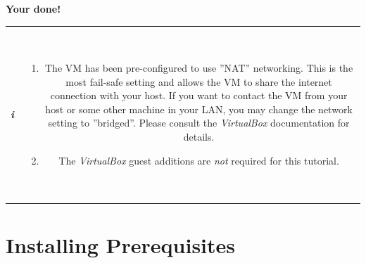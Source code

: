 \documentclass[12pt,english,parskip=half]{scrreprt}
\newcommand{\infobox}[1]{
  \hfill
  \setlength\arrayrulewidth{1pt}
  \begin{tabular}[t]{c|c|}
    \parbox{1.8em}{\hfill\textit{\Huge\textbf{i}\,}}
    &
    \,\parbox{0.89\linewidth}{\setlength{\parskip}{0.5em}#1}\,
  \end{tabular}
  \par
}
\begin{document}
\begin{center}
\textbf{Your done!}
\end{center}


\infobox{
  \begin{enumerate}

  \item
    The VM has been pre-configured to use ''NAT'' networking. This is the most fail-safe setting and
    allows the VM to share the internet connection with your host. If you want to contact the VM from
    your host or some other machine in your LAN, you may change the network setting to ''bridged''.
    Please consult the \textit{VirtualBox} documentation for details.

  \item
    The \emph{VirtualBox} guest additions are \emph{not} required for this tutorial.

  \end{enumerate}
}



%
%
%
%
%
%
%
%
%






\section{Installing Prerequisites}
\label{sec:tutorial-prerequisites}
\end{document}
